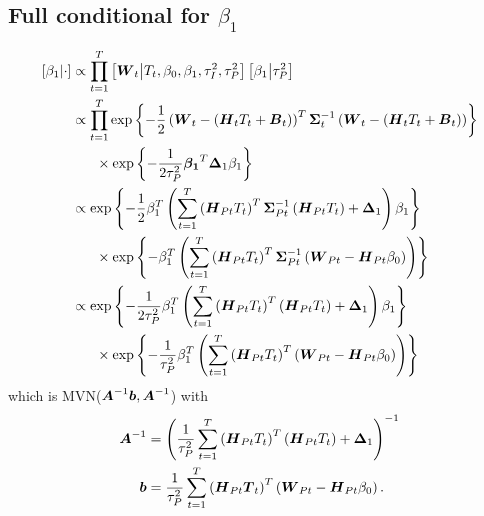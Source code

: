 \documentclass{article}\usepackage[]{graphicx}\usepackage[]{color}
\def\bm#1{\mbox{\boldmath $#1$}}
\begin{document}
\subsection{Full conditional for $\beta_1$}
%
\begin{align*}
%
\left[ \beta_1 \middle| \cdot \right] & \propto \prod_{t = 1}^T \left[ \bm{W}_t \middle| T_t, \beta_0, \beta_1, \tau^2_I, \tau^2_P \right] \left[ \beta_1 \middle| \tau^2_P \right]\\
%
& \propto \prod_{t = 1}^T \exp{ \left\{ - \frac{1} {2} \left( \bm{W}_t - \left( \bm{H}_t T_t + \bm{B}_t \right) \right)^T \bm{\Sigma}_t^{ - 1} \left( \bm{W}_t - \left( \bm{H}_t T_t + \bm{B}_t \right) \right) \right\} }\\
& \hspace{6mm} \times \exp{ \left\{ - \frac{1} {2 \tau^2_P} \bm{\beta_1}^T \bm{\Delta}_1 \beta_1 \right\} }\\
%
& \propto \exp{ \left\{ - \frac{1} {2} \beta_1^T \left( \sum_{t = 1}^T \left( \bm{H}_{Pt} T_t \right)^T \bm{\Sigma}_{Pt}^{ - 1} \left( \bm{H}_{Pt} T_t \right) + \bm{\Delta}_1 \right) \beta_1 \right\} }\\
& \hspace{6mm} \times \exp{ \left\{ - \beta_1^T \left( \sum_{t = 1}^T \left( \bm{H}_{Pt} T_t \right)^T \bm{\Sigma}_{Pt}^{ - 1} \left( \bm{W}_{Pt} - \bm{H}_{P t} \beta_0 \right) \right) \right\} }\\
%
& \propto \exp{ \left\{ - \frac{1} {2 \tau^2_P} \beta_1^T \left( \sum_{t = 1}^T \left( \bm{H}_{Pt} T_t \right)^T \left( \bm{H}_{Pt} T_t \right) + \bm{\Delta}_1 \right) \beta_1 \right\} }\\
& \hspace{6mm} \times \exp{ \left\{ - \frac{1} {\tau^2_P} \beta_1^T \left( \sum_{t = 1}^T \left( \bm{H}_{Pt} T_t \right)^T \left( \bm{W}_{Pt} - \bm{H}_{P t} \beta_0 \right) \right) \right\} }\\
%
%
\end{align*}
%
which is MVN($\bm{A}^{ - 1}\bm{b}, \bm{A}^{ - 1}$) with
%
\begin{align*}
%
\bm{A}^{ - 1} & = \left( \frac{1} {\tau^2_P} \sum_{t = 1}^T \left( \bm{H}_{Pt} T_t \right)^T \left( \bm{H}_{Pt} T_t \right) + \bm{\Delta}_1 \right)^{ - 1}\\
%
\bm{b} & = \frac{1} {\tau^2_P} \sum_{t = 1}^T \left( \bm{H}_{Pt} \bm{T}_t \right)^T \left( \bm{W}_{Pt} - \bm{H}_{P t} \beta_0 \right). \\
%
\end{align*}
%
%
\end{document}
